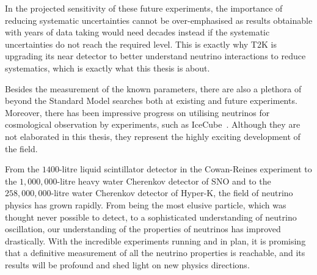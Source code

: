 In the projected sensitivity of these future experiments, the importance of reducing systematic uncertainties cannot be over-emphasised as results obtainable with years of data taking would need decades instead if the systematic uncertainties do not reach the required level.
This is exactly why T2K is upgrading its near detector to better understand neutrino interactions to reduce systematics, which is exactly what this thesis is about.

Besides the measurement of the known parameters, there are also a plethora of beyond the Standard Model searches both at existing and future experiments.
Moreover, there has been impressive progress on utilising neutrinos for cosmological observation by experiments, such as IceCube~\cite{IceCube:2023ame}.
Although they are not elaborated in this thesis, they represent the highly exciting development of the field.

From the $1400$-litre liquid scintillator detector in the Cowan-Reines experiment to the $1,000,000$-litre heavy water Cherenkov detector of SNO and to the $258,000,000$-litre water Cherenkov detector of Hyper-K, the field of neutrino physics has grown rapidly.
From being the most elusive particle, which was thought never possible to detect, to a sophisticated understanding of neutrino oscillation, our understanding of the properties of neutrinos has improved drastically.
With the incredible experiments running and in plan, it is promising that a definitive measurement of all the neutrino properties is reachable, and its results will be profound and shed light on new physics directions.
